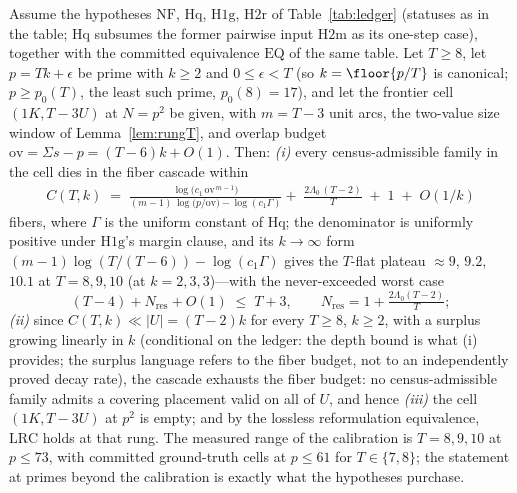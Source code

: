 \begin{theorem}\label{thm:SC}
Assume the hypotheses $\mathrm{NF}$, $\mathrm{Hq}$, $\mathrm{H1g}$,
$\mathrm{H2r}$ of Table~\ref{tab:ledger} (statuses as in the table;
$\mathrm{Hq}$ subsumes the former pairwise input $\mathrm{H2m}$ as its
one-step case), together with the committed equivalence $\mathrm{EQ}$
of the same table. Let $T\ge 8$, let $p=Tk+\epsilon$ be prime with
$k\ge 2$ and $0\le\epsilon<T$ (so $k=\floor{p/T}$ is canonical; $p\ge
p_0(T)$, the least such prime, $p_0(8)=17$), and let the frontier cell
$(1K,T{-}3U)$ at $N=p^2$ be given, with $m=T-3$ unit arcs, the
two-value size window of Lemma~\ref{lem:rungT}, and overlap budget
$\mathrm{ov}=\Sigma s-p=(T-6)k+O(1)$. Then:
\smallskip
\emph{(i)} every census-admissible family in the cell dies in the fiber
cascade within
\begin{multline*}
C(T,k)\;=\;
\frac{\log\!\bigl(c_1\,\mathrm{ov}^{\,m-1}\bigr)}
     {(m-1)\,\log\!\bigl(p/\mathrm{ov}\bigr)-\log(c_1\Gamma)}
+\;\frac{2\Lambda_0\,(T-2)}{T}\;+\;1\;+\;O(1/k)
\end{multline*}
fibers, where $\Gamma$ is the uniform constant of $\mathrm{Hq}$; the
denominator is uniformly positive under $\mathrm{H1g}$'s margin clause,
and its $k\to\infty$ form $(m-1)\log(T/(T-6))-\log(c_1\Gamma)$ gives
the $T$-flat plateau $\approx 9$, $9.2$, $10.1$ at $T=8,9,10$ (at
$k=2,3,3$)---with the never-exceeded worst case
\[
(T-4)+N_{\mathrm{res}}+O(1)\;\le\;T+3,
\qquad
N_{\mathrm{res}}=1+\tfrac{2\Lambda_0(T-2)}{T};
\]
\smallskip
\emph{(ii)} since $C(T,k)\ll|U|=(T-2)k$ for every $T\ge 8$, $k\ge 2$,
with a surplus growing linearly in $k$ (conditional on the ledger: the
depth bound is what (i) provides; the surplus language refers to the
fiber budget, not to an independently proved decay rate), the cascade
exhausts the fiber budget: no census-admissible family admits a
covering placement valid on all of $U$, and hence
\smallskip
\emph{(iii)} the cell $(1K,T{-}3U)$ at $p^2$ is empty; and by the
lossless reformulation equivalence, $\mathrm{LRC}$ holds at that rung.
The measured range of the calibration is $T=8,9,10$ at $p\le 73$, with
committed ground-truth cells at $p\le 61$ for $T\in\{7,8\}$; the
statement at primes beyond the calibration is exactly what the
hypotheses purchase.
\end{theorem}

